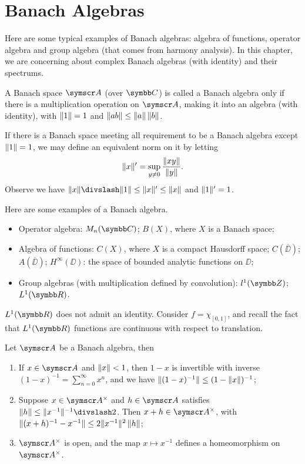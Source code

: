 
\chapter{Banach Algebras}

Here are some typical examples of Banach algebras: algebra of functions, operator algebra and group algebra (that comes from harmony analysis). In this chapter, we are concerning about complex Banach algebras (with identity) and their spectrums.

\begin{definition}
  A Banach space $\BA{A}$ (over $\CC$) is called a Banach algebra only if there is a multiplication operation on $\BA{A}$, making it into an algebra (with identity), with $\Vert1\Vert=1$ and $\Vert ab\Vert\leq \Vert a\Vert\,\Vert b\Vert$.
\end{definition}

If there is a Banach space meeting all requirement to be a Banach algebra except $\Vert1\Vert=1$, we may define an equivalent norm on it by letting
\begin{equation*}
  \Vert x\Vert'=\sup_{y\neq 0}\frac{\Vert xy\Vert}{\Vert y\Vert}.
\end{equation*}
Observe we have $\NORM{x}\DIV\NORM{1}\leq\NORM{x}'\leq\NORM{x}$ and $\Vert1\Vert'=1$.

Here are some examples of a Banach algebra.

\begin{itemize}
  \item Operator algebra: $M_n(\CC)$; $B(X)$, where $X$ is a Banach space;
  \item Algebra of functions: $C(X)$, where $X$ is a compact Hausdorff space; $C(\overline\DD)$; $A(\overline\DD)$; $H^{\infty}(\DD)$: the space of bounded analytic functions on $\DD$;
  \item Group algebras (with multiplication defined by convolution): $l^1(\ZZ)$; $L^1(\RR)$.
\end{itemize}

\begin{example}
  $L^1(\RR)$ does not admit an identity. Consider $f = \chi_{[0, 1]}$, and recall the fact that $L^1(\RR)$ functions are continuous with respect to translation.
\end{example}

\begin{proposition}
  Let $\BA{A}$ be a Banach algebra, then
  \begin{enumerate}
    \item If $x\in \BA{A}$ and $\Vert x\Vert<1$, then $1-x$ is invertible with inverse $(1-x)^{-1}=\sum_{n=0}^\infty x^n$, and we have $\Vert(1-x)^{-1}\Vert\leq (1-\Vert x\Vert)^{-1}$;
    \item Suppose $x\in \BA{A}^\times$ and $h\in \BA{A}$ satisfies $\NORM{h}\leq\NORM{x^{-1}}^{-1}\DIV 2$. Then $x+h\in \BA{A}^{\times}$, with $\Vert(x+h)^{-1}-x^{-1}\Vert\leq 2\Vert x^{-1}\Vert^2\,\Vert h\Vert$;
    \item $\BA{A}^\times$ is open, and the map $x\mapsto x^{-1}$ defines a homeomorphism on $\BA{A}^\times$.
  \end{enumerate}
\end{proposition}

